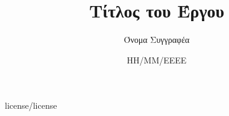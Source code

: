 \documentclass[a4paper,12pt]{article}
\author{Όνομα Συγγραφέα}
\title {Τίτλος του Έργου}
\date{ΗΗ/ΜΜ/ΕΕΕΕ}
\begin{document}
%
\maketitle
%
\cleardoublepage
%
%
 {license/license}
\end{document}
